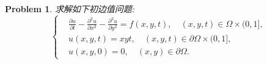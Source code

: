 \documentclass[a4paper, 12pt]{ctexart}
\theoremstyle{plain}
\newtheorem{problem}{Problem}[section]
\theoremstyle{plain}
\theoremstyle{plain}
\theoremstyle{nonumberplain}
\begin{document}
    \begin{problem}
        \label{problem: 2}
        求解如下初边值问题:
        \begin{equation}
            \left\{
            \begin{aligned}
                &\frac{\partial u}{\partial t}-\frac{\partial^{2}u}{\partial x^{2}}-\frac{\partial^{2}u}{\partial y^{2}}=f(x,y,t),\quad (x,y,t)\in \Omega\times(0,1],\\
                &u(x,y,t)=xyt,\quad (x,y,t)\in\partial\Omega\times(0,1],\\
                &u(x,y,0)=0,\quad (x,y)\in\partial\Omega.
            \end{aligned}
            \right.
        \end{equation}
    \end{problem}
\end{document}
